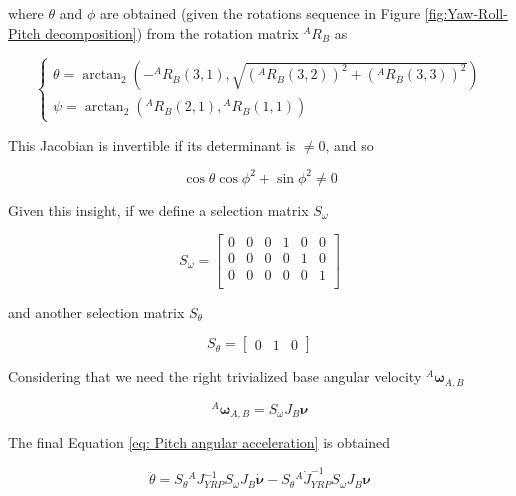 where $\theta$ and $\phi$ are obtained (given the rotations sequence in Figure \ref{fig:Yaw-Roll-Pitch decomposition}) from the rotation matrix ${}^{A}R_{B}$ as

\begin{equation}
\begin{cases}
    \theta = \arctan_{2}(-{}^{A}R_{B}(3,1),\sqrt{({}^{A}R_{B}(3,2))^2+({}^{A}R_{B}(3,3))^2}) \\
    \psi = \arctan_{2}({}^{A}R_{B}(2,1),{}^{A}R_{B}(1,1)) 
    \end{cases}
\end{equation}


This Jacobian is invertible if its determinant is $\neq 0$, and so 

\begin{equation*}
    \cos{\theta}\cos{\phi}^{2} + \sin{\phi}^{2} \neq 0
\end{equation*}

Given this insight, if we define a selection matrix $S_{\omega}$


\begin{equation*}
    S_{\omega} = \begin{bmatrix}
 0 & 0 & 0 & 1 & 0 & 0 \\
 0 & 0 & 0 & 0 & 1 & 0 \\
 0 & 0 & 0 & 0 & 0 & 1 \\
\end{bmatrix}
\end{equation*}

and another selection matrix $S_{\theta}$

\begin{equation*}
    S_{\theta} = \begin{bmatrix}
 0 & 1 & 0 
\end{bmatrix}
\end{equation*}

Considering that we need the right trivialized base angular velocity ${}^{A}\bm{\omega}_{A,B}$

\begin{equation*}
  {}^{A}\bm{\omega}_{A,B} =  S_{\omega}J_{B}\bm{\nu}  
\end{equation*}

The final Equation \eqref{eq: Pitch angular acceleration} is obtained 

\begin{equation*}
    \ddot{\theta} = S_{\theta}{}^{A}J^{-1}_{YRP}S_{\omega}J_{B}\dot{\bm{\nu}} - S_{\theta}{}^{A}\dot{J}^{-1}_{YRP}S_{\omega}J_{B}\bm{\nu}
\end{equation*}

